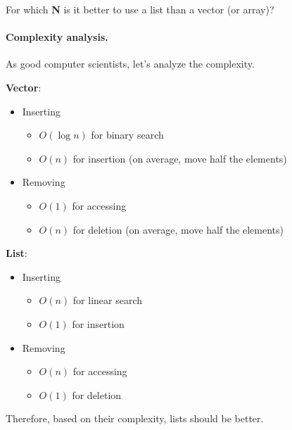 \documentclass[a4paper]{report}
\begin{document}
For which {\bf N} is it better to use a list than a vector (or array)?

 
\paragraph{Complexity analysis.} As good computer scientists, let's analyze
the complexity.  

{\bf Vector}:\\[-2em]
      \begin{itemize}
        \item Inserting\\[-2em]
          \begin{itemize}
            \item $O(\log n)$ for binary search
            \item $O(n)$ for insertion (on average, move half the elements)
          \end{itemize}
        \item Removing\\[-2em]
          \begin{itemize}
            \item $O(1)$ for accessing
            \item $O(n)$ for deletion (on average, move half the elements)
          \end{itemize}
      \end{itemize}

{\bf List}:\\[-2em]
      \begin{itemize}
        \item Inserting\\[-2em]
          \begin{itemize}
            \item $O(n)$ for linear search
            \item $O(1)$ for insertion
          \end{itemize}
        \item Removing\\[-2em]
          \begin{itemize}
            \item $O(n)$ for accessing
            \item $O(1)$ for deletion
          \end{itemize}
      \end{itemize}

Therefore, based on their complexity, lists should be better.
\end{document}
